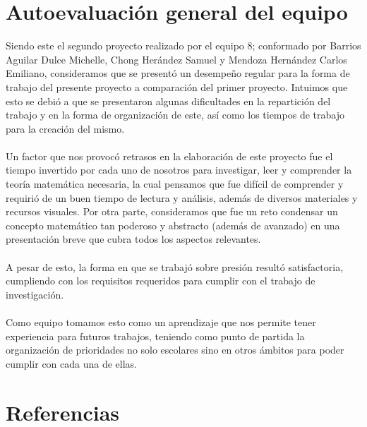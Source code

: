 \documentclass{article}
\begin{document}
\section{Autoevaluación general del equipo}
Siendo este el segundo proyecto realizado por el equipo 8; conformado por Barrios Aguilar Dulce Michelle, Chong Herández Samuel y Mendoza Hernández Carlos Emiliano, consideramos que se presentó un desempeño regular para la forma de trabajo del presente proyecto a comparación del primer proyecto. Intuimos que esto se debió a que se presentaron algunas dificultades en la repartición del trabajo y en la forma de organización de este, así como los tiempos de trabajo para la creación del mismo. \\ \\
Un factor que nos provocó retrasos en la elaboración de este proyecto fue el tiempo invertido por cada uno de nosotros para investigar, leer y comprender la teoría matemática necesaria, la cual pensamos que fue difícil de comprender y requirió de un buen tiempo de lectura y análisis, además de diversos materiales y recursos visuales. Por otra parte, consideramos que fue un reto condensar un concepto matemático tan poderoso y abstracto (además de avanzado) en una presentación breve que cubra todos los aspectos relevantes. \\ \\
A pesar de esto, la forma en que se trabajó sobre presión resultó satisfactoria, cumpliendo con los requisitos requeridos para cumplir con el trabajo de investigación. \\ \\
Como equipo tomamos esto como un aprendizaje que nos permite tener experiencia para futuros trabajos, teniendo como punto de partida la organización de prioridades no solo escolares sino en otros ámbitos para poder cumplir con cada una de ellas. 

\newpage
\section{Referencias}
\end{document}
